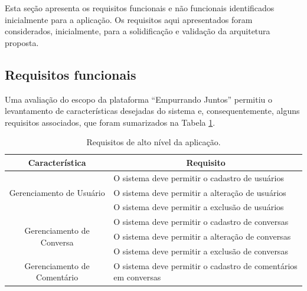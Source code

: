Esta seção apresenta os requisitos funcionais e não funcionais identificados inicialmente para a aplicação.
Os requisitos aqui apresentados foram considerados, inicialmente, para a solidificação e validação da arquitetura proposta.

\subsection*{Requisitos funcionais}
  
    Uma avaliação do escopo da plataforma ``Empurrando Juntos'' permitiu o levantamento de características desejadas do sistema e,
    consequentemente, alguns requisitos associados, que foram sumarizados na Tabela \ref{tab:requisitos}.

    \begin{table}[h!]
    \centering
    \caption{Requisitos de alto nível da aplicação.}
    \label{tab:requisitos}
    \begin{tabular}{@{}cl@{}}
    \toprule
    \textbf{Característica}                      & \multicolumn{1}{c}{\textbf{Requisito}}                                                                                                \\ \midrule
    \multirow{3}{*}{Gerenciamento de Usuário}    & O sistema deve permitir o cadastro de usuários                                                                                        \\
						& O sistema deve permitir a alteração de usuários                                                                                       \\
						& O sistema deve permitir a exclusão de usuários                                                                                         \\
    \multirow{3}{*}{Gerenciamento de Conversa}   & O sistema deve permitir o cadastro de conversas                                                                                       \\
						& O sistema deve permitir a alteração de conversas                                                                                      \\
						& O sistema deve permitir a exclusão de conversas                                                                                       \\ \midrule
    \multirow{4}{*}{Gerenciamento de Comentário} & O sistema deve permitir o cadastro de comentários em conversas                                                                        \\

\end{tabular}
\end{table}

